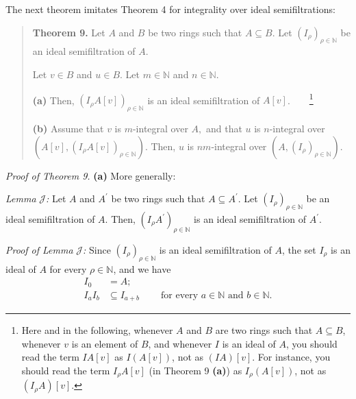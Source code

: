 \documentclass[12pt,final,notitlepage,onecolumn]{article}%
\begin{document}
The next theorem imitates Theorem 4 for integrality over ideal semifiltrations:

\begin{quote}
\textbf{Theorem 9.} Let $A$ and $B$ be two rings such that $A\subseteq B$. Let
$\left(  I_{\rho}\right)  _{\rho\in\mathbb{N}}$ be an ideal semifiltration of
$A$.

Let $v\in B$ and $u\in B$. Let $m\in\mathbb{N}$ and $n\in\mathbb{N}$.

\textbf{(a)} Then, $\left(  I_{\rho}A\left[  v\right]  \right)  _{\rho
\in\mathbb{N}}$ is an ideal semifiltration of $A\left[  v\right]
$.\ \ \ \ \footnote{Here and in the following, whenever $A$ and $B$ are two
rings such that $A\subseteq B$, whenever $v$ is an element of $B$, and
whenever $I$ is an ideal of $A$, you should read the term $IA\left[  v\right]
$ as $I\left(  A\left[  v\right]  \right)  $, not as $\left(  IA\right)
\left[  v\right]  $. For instance, you should read the term $I_{\rho}A\left[
v\right]  $ (in Theorem 9 \textbf{(a)}) as $I_{\rho}\left(  A\left[  v\right]
\right)  $, not as $\left(  I_{\rho}A\right)  \left[  v\right]  $.}

\textbf{(b)} Assume that $v$ is $m$-integral over $A,$ and that $u$ is
$n$-integral over $\left(  A\left[  v\right]  ,\left(  I_{\rho}A\left[
v\right]  \right)  _{\rho\in\mathbb{N}}\right)  $. Then, $u$ is $nm$-integral
over $\left(  A,\left(  I_{\rho}\right)  _{\rho\in\mathbb{N}}\right)  $.
\end{quote}

\textit{Proof of Theorem 9.} \textbf{(a)} More generally:

\textit{Lemma }$\mathcal{J}$\textit{:} Let $A$ and $A^{\prime}$ be two rings
such that $A\subseteq A^{\prime}$. Let $\left(  I_{\rho}\right)  _{\rho
\in\mathbb{N}}$ be an ideal semifiltration of $A$. Then, $\left(  I_{\rho
}A^{\prime}\right)  _{\rho\in\mathbb{N}}$ is an ideal semifiltration of
$A^{\prime}$.

\textit{Proof of Lemma }$\mathcal{J}$\textit{:} Since $\left(  I_{\rho
}\right)  _{\rho\in\mathbb{N}}$ is an ideal semifiltration of $A$, the set
$I_{\rho}$ is an ideal of $A$ for every $\rho\in\mathbb{N}$, and we have%
\begin{align*}
I_{0}  &  =A;\\
I_{a}I_{b}  &  \subseteq I_{a+b}\ \ \ \ \ \ \ \ \ \ \text{for every }%
a\in\mathbb{N}\text{ and }b\in\mathbb{N}.
\end{align*}
\end{document}
